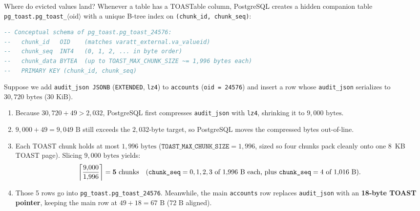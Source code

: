 Where do evicted values land? Whenever a table has a TOASTable column, PostgreSQL creates a hidden companion table \texttt{pg\_toast.pg\_toast\_}$\langle\text{oid}\rangle$ with a unique B-tree index on \texttt{(chunk\_id, chunk\_seq)}:

\begin{lstlisting}[language=SQL]
-- Conceptual schema of pg_toast.pg_toast_24576:
--   chunk_id   OID    (matches varatt_external.va_valueid)
--   chunk_seq  INT4   (0, 1, 2, ... in byte order)
--   chunk_data BYTEA  (up to TOAST_MAX_CHUNK_SIZE ~= 1,996 bytes each)
--   PRIMARY KEY (chunk_id, chunk_seq)
\end{lstlisting}

\begin{example}
\label{ex:ch02-toast-chunks}
Suppose we add \texttt{audit\_json JSONB} (\texttt{EXTENDED}, \texttt{lz4}) to \texttt{accounts} (\texttt{oid = 24576}) and insert a row whose \texttt{audit\_json} serializes to $30{,}720\text{ bytes}$ ($30\text{ KiB}$).
\begin{enumerate}
  \item Because $30{,}720 + 49 > 2{,}032$, PostgreSQL first compresses \texttt{audit\_json} with \texttt{lz4}, shrinking it to \textbf{$9{,}000\text{ bytes}$}.
  \item $9{,}000 + 49 = 9{,}049\text{ B}$ still exceeds the $2{,}032$-byte target, so PostgreSQL moves the compressed bytes out-of-line.
  \item Each TOAST chunk holds at most $1{,}996\text{ bytes}$ ($\texttt{TOAST\_MAX\_CHUNK\_SIZE} = 1{,}996$, sized so four chunks pack cleanly onto one 8~KB TOAST page). Slicing $9{,}000\text{ bytes}$ yields:
  \[
    \ceil*{\frac{9{,}000}{1{,}996}} = \mathbf{5\text{ chunks}} \quad (\texttt{chunk\_seq} = 0, 1, 2, 3\text{ of }1{,}996\text{ B each, plus }\texttt{chunk\_seq} = 4\text{ of }1{,}016\text{ B}).
  \]
  \item Those 5 rows go into \texttt{pg\_toast.pg\_toast\_24576}. Meanwhile, the main \texttt{accounts} row replaces \texttt{audit\_json} with an \textbf{18-byte TOAST pointer}, keeping the main row at $49 + 18 = 67\text{ B}$ ($72\text{ B}$ aligned).
\end{enumerate}
\end{example}

